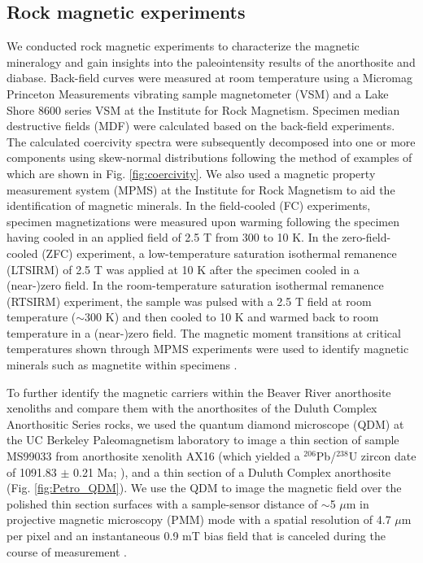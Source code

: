 \subsection*{Rock magnetic experiments}

We conducted rock magnetic experiments to characterize the magnetic mineralogy and gain insights into the paleointensity results of the anorthosite and diabase. Back-field curves were measured at room temperature using a Micromag Princeton Measurements vibrating sample magnetometer (VSM) and a Lake Shore 8600 series VSM at the Institute for Rock Magnetism. Specimen median destructive fields (MDF) were calculated based on the back-field experiments. The calculated coercivity spectra were subsequently decomposed into one or more components using skew-normal distributions following the method of  \citealp{Maxbauer2016a} examples of which are shown in Fig. \ref{fig:coercivity}. We also used a magnetic property measurement system (MPMS) at the Institute for Rock Magnetism to aid the identification of magnetic minerals. In the field-cooled (FC) experiments, specimen magnetizations were measured upon warming following the specimen having cooled in an applied field of 2.5 T from 300 to 10 K. In the zero-field-cooled (ZFC) experiment, a low-temperature saturation isothermal remanence (LTSIRM) of 2.5 T was applied at 10 K after the specimen cooled in a (near-)zero field. In the room-temperature saturation isothermal remanence (RTSIRM) experiment, the sample was pulsed with a 2.5 T field at room temperature ($\sim$300 K) and then cooled to 10 K and warmed back to room temperature in a (near-)zero field. The magnetic moment transitions at critical temperatures shown through MPMS experiments were used to identify magnetic minerals such as magnetite within specimens \citep{Feinberg2015a}. 

To further identify the magnetic carriers within the Beaver River anorthosite xenoliths and compare them with the anorthosites of the Duluth Complex Anorthositic Series rocks, we used the quantum diamond microscope (QDM) at the UC Berkeley Paleomagnetism laboratory to image a thin section of sample MS99033 from anorthosite xenolith AX16 (which yielded a $^{206}$Pb/$^{238}$U zircon date of 1091.83 $\pm$ 0.21 Ma;  \citealp{Zhang2021b}), and a thin section of a Duluth Complex anorthosite (Fig. \ref{fig:Petro_QDM}). We use the QDM to image the magnetic field over the polished thin section surfaces with a sample-sensor distance of $\sim$5 $\mu$m in projective magnetic microscopy (PMM) mode with a spatial resolution of 4.7 $\mu$m per pixel and an instantaneous 0.9 mT bias field that is canceled during the course of measurement \citep{Glenn2017a}.

